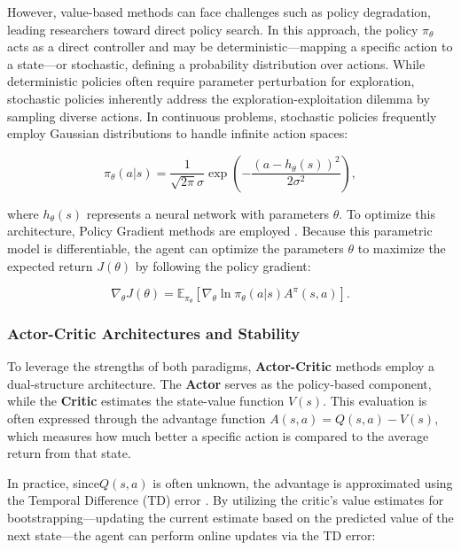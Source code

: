 However, value-based methods can face challenges such as policy degradation, leading researchers toward direct policy search. In this approach, the policy $\pi_\theta$ acts as a direct controller and may be deterministic—mapping a specific action to a state—or stochastic, defining a probability distribution over actions. While deterministic policies often require parameter perturbation for exploration, stochastic policies inherently address the exploration-exploitation dilemma by sampling diverse actions. In continuous problems, stochastic policies frequently employ Gaussian distributions to handle infinite action spaces:

\begin{equation} \label{eq:stochastic_policy}
\pi_\theta(a|s) = \frac{1}{\sqrt{2\pi}\sigma} \exp\left( -\frac{(a - h_\theta(s))^2}{2\sigma^2} \right),
\end{equation}

where $h_\theta(s)$ represents a neural network with parameters $\theta$. To optimize this architecture, Policy Gradient methods are employed \citep{peters2010policy}. Because this parametric model is differentiable, the agent can optimize the parameters $\theta$ to maximize the expected return $J(\theta)$ by following the policy gradient:

\begin{equation} \label{eq:policy_gradient}
\nabla_\theta J(\theta) = \mathbb{E}_{\pi_\theta} [\nabla_\theta \ln \pi_\theta(a|s) A^\pi(s, a)].
\end{equation}

\subsubsection{Actor-Critic Architectures and Stability}

To leverage the strengths of both paradigms, \textbf{Actor-Critic} methods \citep{konda1999actorcritic} employ a dual-structure architecture. The \textbf{Actor} serves as the policy-based component, while the \textbf{Critic} estimates the state-value function $V(s)$. This evaluation is often expressed through the advantage function $A(s, a) = Q(s, a) - V(s)$, which measures how much better a specific action is compared to the average return from that state.

In practice, since$Q(s, a)$ is often unknown, the advantage is approximated using the Temporal Difference (TD) error \citep{sutton1988td}. By utilizing the critic’s value estimates for bootstrapping—updating the current estimate based on the predicted value of the next state—the agent can perform online updates via the TD error:

